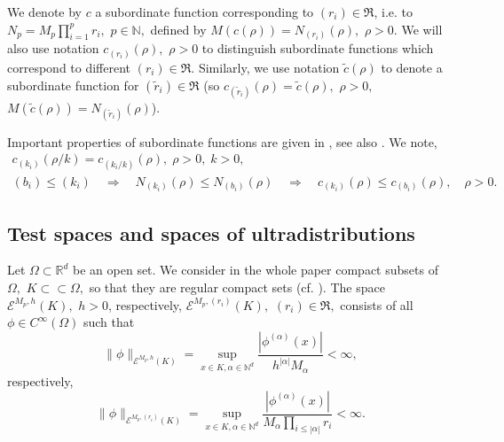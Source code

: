 \documentclass[sn-mathphys,Numbered]{sn-jnl}%
\theoremstyle{thmstyleone}%
\theoremstyle{thmstyletwo}%
\theoremstyle{thmstylethree}%
\begin{document}
We denote by  $c$  a subordinate function  corresponding to $(r_i)\in\mathfrak R$, i.e. to $N_p=M_p\prod_{i=1}^pr_i,$ $p\in\mathbb{N},$ defined by $M(c(\rho))=N_{(r_i)}(\rho), $ $\rho>0.$ We will also use notation $c_{(r_i)}(\rho),$ $\rho>0$ to  distinguish subordinate functions which correspond to different $(r_i)\in \mathfrak{R}.$ Similarly,  we use notation $\tilde c(\rho)$ to denote a subordinate function for $(\tilde r_i)\in \mathfrak{R}$ (so  $c_{(\tilde r_i)}(\rho)=\tilde c(\rho),$ $\rho>0,$ $M(\tilde c(\rho))=N_{(\tilde r_i)}(\rho)$).

Important  properties of  subordinate functions are given in \cite{Komatsu1},  see also  \cite{KMMP}.
We note,
\begin{gather*}
c_{(k_i)}(\rho/k)=c_{(k_i/k)}(\rho),\;\rho>0,\;k>0,\\
(b_i)\leq (k_i)\quad \Rightarrow\quad N_{(k_i)}(\rho)\leq N_{(b_i)}(\rho)\quad\Rightarrow\quad c_{(k_i)}(\rho)\leq c_{(b_i)}(\rho),\quad \rho>0.
\end{gather*}


\subsection{Test spaces and spaces of ultradistributions}
\label{sec1.3}

Let $\Omega\subset \mathbb{R}^d$ be an open set.  We consider in the whole paper compact subsets of $\Omega,$ $K\subset\subset \Omega,$ so that they are regular compact sets (cf. \cite{Komatsu1}).  The space $\mathcal{E}^{M_p,h}(K), $ $h>0$, respectively,  $\mathcal{E}^{M_p,(r_i)}(K), $ $(r_i)\in\mathfrak R,$ consists of all $\phi\in C^\infty(\Omega)$ such that
\begin{equation*}
\|\phi\|_{\mathcal{E}^{M_p,h}(K)}=\sup_{x\in K,\alpha\in \mathbb{N}^d}\frac{|\phi^{(\alpha)}(x)|}{h^{|\alpha|} M_{\alpha}}<\infty,
\end{equation*}
respectively,
\begin{equation*}
\|\phi\|_{\mathcal{E}^{M_p,(r_i)}(K)}=\sup_{x\in K,\alpha\in \mathbb{N}^d}\frac{|\phi^{(\alpha)}(x)|}{M_{\alpha}\prod_{i\leq|\alpha|}r_i}<\infty.
\end{equation*}
\end{document}
